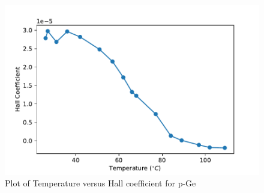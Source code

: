 \documentclass[a4paper, amsfonts, amssymb, amsmath, reprint, showkeys, nofootinbib, twoside]{revtex4-1}
\begin{document}
\begin{figure}[H]
	\centering
	\includegraphics[scale=0.55]{5} 
	\caption{Plot of Temperature versus Hall coefficient for p-Ge}
	\label{6}
\end{figure}
\end{document}
